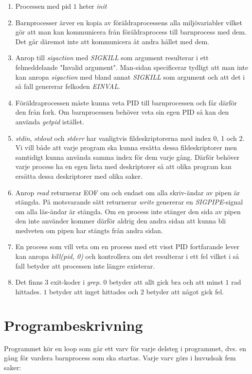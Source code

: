 \documentclass[10pt,a4paper]{article}
\begin{document}
\begin{enumerate}
\item Processen med pid $1$ heter \emph{init}
\item Barnprocesser ärver en kopia av föräldraprocessens alla miljövariabler vilket gör att man kan kommunicera från föräldraprocess till barnprocess med dem. Det går däremot inte att kommunicera åt andra hållet med dem.
\item Anrop till \emph{sigaction} med \emph{SIGKILL} som argument resulterar i ett felmeddelande "Invalid argument". Man-sidan specificerar tydligt att man inte kan anropa \emph{sigaction} med bland annat \emph{SIGKILL} som argument och att det i så fall genererar felkoden \emph{EINVAL}. 
\item Föräldraprocessen måste kunna veta PID till barnprocessen och får därför den från fork. Om barnprocessen behöver veta sin egen PID så kan den använda \emph{getpid} istället.
\item \emph{stdin}, \emph{stdout} och \emph{stderr} har vanligtvis  fildeskriptorerna med index 0, 1 och 2. Vi vill både att varje program ska kunna ersätta dessa fildeskriptorer men samtidigt kunna använda samma index för dem varje gång. Därför behöver varje process ha en egen lista med deskriptorer så att olika program kan ersätta dessa deskriptorer med olika saker.
\item Anrop \emph{read} returnerar EOF om och endast om alla skriv-ändar av pipen är stängda. På motsvarande sätt returnerar \emph{write} genererar en \emph{SIGPIPE}-signal om alla läs-ändar är stängda. Om en process inte stänger den sida av pipen den inte använder kommer därför aldrig den andra sidan att kunna bli medveten om pipen har stängts från andra sidan.
\item En process som vill veta om en process med ett visst PID fortfarande lever kan anropa \emph{kill(pid, 0)} och kontrollera om det resulterar i ett fel vilket i så fall betyder att processen inte längre existerar.
\item Det finns 3 exit-koder i \emph{grep}. $0$ betyder att allt gick bra och att minst $1$ rad hittades. $1$ betyder att inget hittades och $2$ betyder att något gick fel.
\end{enumerate}

\section{Programbeskrivning}

Programmet kör en loop som går ett varv för varje delsteg i programmet, dvs. en gång för vardera barnprocess som ska startas. Varje varv görs i huvudsak fem saker:
\end{document}
